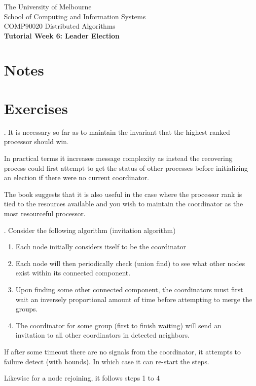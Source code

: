 \documentclass[12pt]{article}
\newcounter{question}
\newcommand{\question}[1]{
    \stepcounter{question}
    \thequestion. #1 \hfill
}
\begin{document}
\begin{center}
    {\sc The University of Melbourne
        \\
        School of Computing and Information Systems
        \\
    COMP90020 Distributed Algorithms}
    \bigskip \\
    {\Large\bf Tutorial Week 6: Leader Election}
    \bigskip \\
\end{center}

\section*{Notes}



\section*{Exercises}

\setcounter{question}{24}

\question{It is necessary so far as to maintain the invariant that the highest ranked processor should win.

    In practical terms it increases message complexity as instead the recovering process could first
    attempt to get the status of other processes before initializing an election if there were no current
    coordinator.


    The book suggests that it is also useful in the case where the processor rank is tied to the resources available
    and you wish to maintain the coordinator as the most resourceful processor.
}

\question{Consider the following algorithm (invitation algorithm)

    \begin{enumerate}
        \item Each node initially considers itself to be the coordinator
        \item Each node will then periodically check (union find) to see what other nodes exist within its connected component.
        \item Upon finding some other connected component, the coordinators must first wait an inversely proportional amount of time before attempting to merge the groups.
        \item The coordinator for some group (first to finish waiting) will send an invitation to all other coordinators in detected neighbors.


    \end{enumerate}

    If after some timeout there are no signals from the coordinator, it attempts  to failure detect (with bounds).
    In which case it can re-start the steps.


    Likewise for a node rejoining, it follows steps 1 to 4
}
\end{document}
